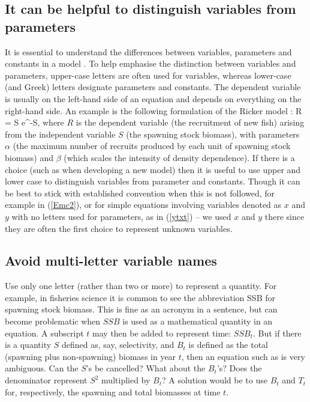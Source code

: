 \subsection*{It can be helpful to distinguish variables from parameters}

It is essential to understand the differences between variables, parameters and
constants in a model \citep{ps93}. To help emphasise the distinction between
variables and parameters,
upper-case letters are often used for variables, whereas lower-case (and Greek)
letters designate parameters and constants. The dependent variable is usually on
the
left-hand side of an equation and depends on everything on the right-hand side.
An example is the following formulation of the Ricker model \citep{bjorks12}:
\eb
R = \alpha S \mbox{e}^{-\beta S},
\label{ricker}
\ee
where $R$ is the dependent variable (the recruitment of new fish) arising from
the independent variable $S$ (the spawning stock biomass), with parameters
 $\alpha$ (the maximum number of recruits produced by each unit
of spawning stock biomass) and $\beta$ (which scales the intensity of density
dependence). If there is a choice (such as when
developing a new model) then it is useful to use upper and lower case to
distinguish variables from parameter and constants.
Though it can be best
to stick with established convention when this is not followed, for example in
(\ref{Emc2}), or for simple equations involving variables denoted as $x$ and $y$
with no letters used for parameters, as in (\ref{ytxt}) -- we used $x$ and $y$
there since they are often the first choice to represent unknown variables.

\subsection*{Avoid multi-letter variable names}

Use only one letter (rather than two or more) to represent a quantity.
For example, in fisheries science
it is common to see the abbreviation SSB for spawning stock biomass.
This is fine as an acronym in a sentence, but can become problematic when
$SSB$ is used as a mathematical quantity in an equation. A subscript $t$
may then be added to represent time: $SSB_t$. But if there is a
quantity
$S$ defined as, say, selectivity, and $B_t$ is defined as the total (spawning
plus non-spawning) biomass in year $t$, then an equation such as
\eb
{}
\label{SSB}
\ee
is very ambiguous. Can the $S$'s be cancelled? What about the $B_t$'s? Does
the denominator represent $S^2$ multiplied by $B_t$? A solution would be to use
$B_t$ and $T_t$ for, respectively, the spawning and
total biomasses at time $t$.


